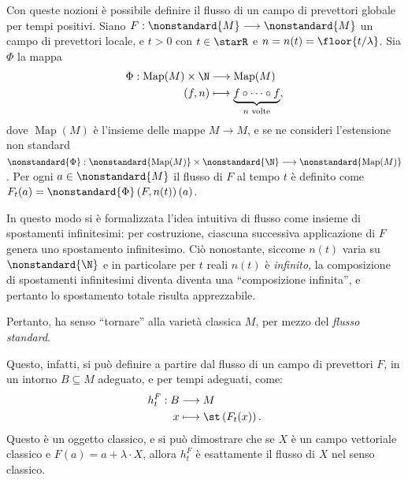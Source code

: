 Con queste nozioni è possibile definire il flusso di un campo di prevettori globale per tempi positivi. Siano $ F: \nonstandard{M} \longrightarrow \nonstandard{M}  $ un campo di prevettori locale, e $ t>0 $ con $ t \in \starR $ e  $ n = n(t) = \floor{t/\lambda} $. Sia $ \Phi $ la mappa \begin{align*}
    \Phi:\operatorname{Map}(M) \times \N &\longrightarrow \operatorname{Map}(M) \\
    (f,n) &\longmapsto \underset{n\text{ volte}}{\underbrace{f\circ \dots\circ f}},
    \end{align*}dove $ \operatorname{Map}(M) $ è l'insieme delle mappe $ M \longrightarrow M$, e se ne consideri l'estensione non standard $ \nonstandard{\Phi}: \nonstandard{\operatorname{Map}(M)}\times \nonstandard{\N} \longrightarrow \nonstandard{\operatorname{Map}(M)} $. Per ogni $ a \in \nonstandard{M} $ il flusso di $ F $ al tempo $ t $ è definito come $ F_{t}(a) = \nonstandard{\Phi}\left(F,n(t)\right)(a) $. 

In questo modo si è formalizzata l'idea intuitiva di flusso come insieme di spostamenti infinitesimi: per costruzione, ciascuna successiva applicazione di $ F $ genera uno spostamento infinitesimo. Ciò nonostante, siccome $ n(t) $ varia su $ \nonstandard{\N} $ e in particolare per $ t $ reali $ n(t) $ è \emph{infinito}, la composizione di spostamenti infinitesimi diventa diventa una ``composizione infinita'', e pertanto lo spostamento totale risulta apprezzabile. 

Pertanto, ha senso ``tornare'' alla varietà classica $ M $, per mezzo del \emph{flusso standard}.


Questo, infatti, si può definire a partire dal flusso di un campo di prevettori $ F $, in un intorno $ B \subseteq M$ adeguato, e per tempi adeguati, come: \begin{align*}
h^{F}_t:B &\longrightarrow M \\
x &\longmapsto \st\left(F_{t}(x) \right).
\end{align*}Questo è un oggetto classico, e si può dimostrare che se $ X $ è un campo vettoriale classico e $ F(a) =a + \lambda \cdot X $, allora $ h_{t}^{F}  $  è esattamente il flusso di $ X $ nel senso classico. 

